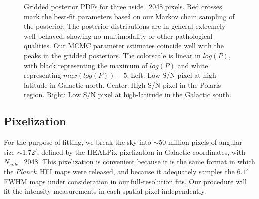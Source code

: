 \documentclass{emulateapj}
\newcommand{\PLANCK}{{\it Planck}}
\begin{document}

\begin{figure*}
\begin{center}
\caption{Gridded posterior PDFs for three nside=2048 pixels. Red crosses mark 
the best-fit parameters based on our Markov chain sampling of the posterior. 
The posterior distributions are in general extremely well-behaved, showing
no multimodality or other pathological qualities. Our MCMC parameter 
estimates coincide well with the peaks in the gridded posteriors. The 
colorscale is linear in $log(P)$, with black representing the maximum of 
$log(P)$ and white representing $max(log(P))-5$. Left: Low S/N pixel at 
high-latitude in Galactic north. Center: High S/N pixel in the Polaris region. 
Right: Low S/N pixel at high-latitude in the Galactic south.}
\end{center}
\end{figure*}


\subsection{Pixelization}
\label{sec:pix}
For the purpose of fitting, we break the sky into $\sim$50 million pixels of 
angular size $\sim$1.72$'$, defined by the HEALPix pixelization in Galactic 
coordinates, with $N_{side}$=2048. This pixelization is convenient because it 
is the same format in which the \PLANCK~HFI maps were released, and because it 
adequately samples the $6.1'$ FWHM maps under consideration in our 
full-resolution fits. Our procedure will fit the intensity measurements in each
spatial pixel independently.
\end{document}
